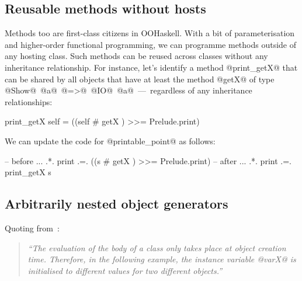 


\medskip

\subsection{Reusable methods without hosts}

Methods too are first-class citizens in OOHaskell. With a bit of
parameterisation and higher-order functional programming, we can
programme methods outside of any hosting class. Such methods can be
reused across classes without any inheritance relationship.  For
instance, let's identify a method @print_getX@ that can be shared by
all objects that have at least the method @getX@ of type
@Show@~@a@~@=>@~@IO@~@a@~---~regardless of any inheritance
relationships:

\begin{code}
 print_getX self = ((self # getX ) >>= Prelude.print)
\end{code}

\noindent
We can update the code for @printable_point@ as follows:

\begin{code}
 -- before
 ... .*. print    .=. ((s # getX ) >>= Prelude.print)
 -- after
 ... .*. print    .=. print_getX s
\end{code}






\medskip

\subsection{Arbitrarily nested object generators}

Quoting from~\cite[\S\,3.1]{OCaml}:

\begin{quote}\itshape\small
``The evaluation of the body of a class only takes place at object
creation time.  Therefore, in the following example, the instance
variable @varX@ is initialised to different values for two different
objects.''
\end{quote}

